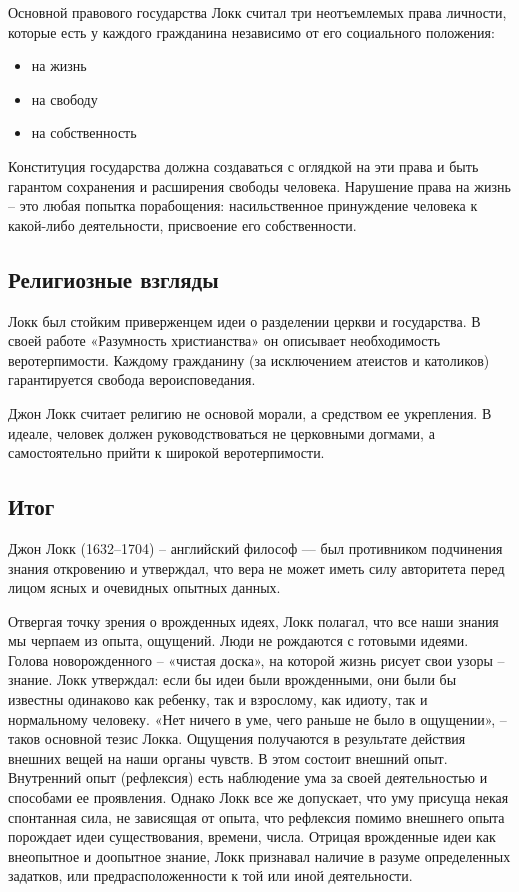 \documentclass[
]{article}
\providecommand{\tightlist}{%
  \setlength{\itemsep}{0pt}\setlength{\parskip}{0pt}}
\begin{document}
Основной правового государства Локк считал три неотъемлемых права
личности, которые есть у каждого гражданина независимо от его
социального положения:

\begin{itemize}
\tightlist
\item
  на жизнь
\item
  на свободу
\item
  на собственность
\end{itemize}

Конституция государства должна создаваться с оглядкой на эти права и
быть гарантом сохранения и расширения свободы человека. Нарушение права
на жизнь -- это любая попытка порабощения: насильственное принуждение
человека к какой-либо деятельности, присвоение его собственности.

\hypertarget{ux440ux435ux43bux438ux433ux438ux43eux437ux43dux44bux435-ux432ux437ux433ux43bux44fux434ux44b}{%
\subsection{Религиозные
взгляды}\label{ux440ux435ux43bux438ux433ux438ux43eux437ux43dux44bux435-ux432ux437ux433ux43bux44fux434ux44b}}

Локк был стойким приверженцем идеи о разделении церкви и государства. В
своей работе «Разумность христианства» он описывает необходимость
веротерпимости. Каждому гражданину (за исключением атеистов и католиков)
гарантируется свобода вероисповедания.

Джон Локк считает религию не основой морали, а средством ее укрепления.
В идеале, человек должен руководствоваться не церковными догмами, а
самостоятельно прийти к широкой веротерпимости.

\hypertarget{ux438ux442ux43eux433-10}{%
\subsection{Итог}\label{ux438ux442ux43eux433-10}}

Джон Локк (1632--1704) -- английский философ --- был противником
подчинения знания откровению и утверждал, что вера не может иметь силу
авторитета перед лицом ясных и очевидных опытных данных.

Отвергая точку зрения о врожденных идеях, Локк полагал, что все наши
знания мы черпаем из опыта, ощущений. Люди не рождаются с готовыми
идеями. Голова новорожденного -- «чистая доска», на которой жизнь рисует
свои узоры -- знание. Локк утверждал: если бы идеи были врожденными, они
были бы известны одинаково как ребенку, так и взрослому, как идиоту, так
и нормальному человеку. «Нет ничего в уме, чего раньше не было в
ощущении», -- таков основной тезис Локка. Ощущения получаются в
результате действия внешних вещей на наши органы чувств. В этом состоит
внешний опыт. Внутренний опыт (рефлексия) есть наблюдение ума за своей
деятельностью и способами ее проявления. Однако Локк все же допускает,
что уму присуща некая спонтанная сила, не зависящая от опыта, что
рефлексия помимо внешнего опыта порождает идеи существования, времени,
числа. Отрицая врожденные идеи как внеопытное и доопытное знание, Локк
признавал наличие в разуме определенных задатков, или
предрасположенности к той или иной деятельности.
\end{document}
